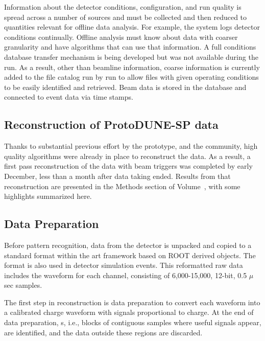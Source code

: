 Information about the detector conditions,  configuration, and run quality is spread across a number of sources and must be collected and then reduced to quantities relevant for offline data analysis.  For example, the  system logs detector conditions continually.  Offline analysis must know about data with coarser granularity and have algorithms that can use that information. A full conditions database transfer mechanism is being developed but was not available during the run.  As a result, other than beamline information, coarse information is currently added to the  file catalog run by run to allow files with given operating conditions to be easily identified and retrieved. Beam data is stored in the 
database and connected to event data via time stamps.

\subsection{Reconstruction of ProtoDUNE-SP data}
Thanks to substantial previous effort by the  prototype,  and the   community, high quality algorithms were already in place to reconstruct the   data.  As a result, a first pass reconstruction of the  data with beam triggers was completed by early December, less than a month after data taking ended.  Results from that reconstruction are presented in the Methods section of Volume~\volnumberphysics,\voltitlephysics{} with some highlights summarized here. 



\subsection{Data Preparation}

Before pattern recognition, data from the  detector is
unpacked and copied to a standard format within the art framework based on ROOT  derived objects. 
The format is also used in detector simulation events.
This reformatted raw data includes the waveform for each channel, consisting of 6,000-15,000,  12-bit, 0.5 $\mu$sec samples. 

The first step in reconstruction is data preparation to
convert each  waveform into a calibrated charge waveform with
signals proportional to charge. At the end of data preparation, s, i.e., blocks of contiguous samples where
useful signals appear, are identified, and the data outside these regions are discarded.



